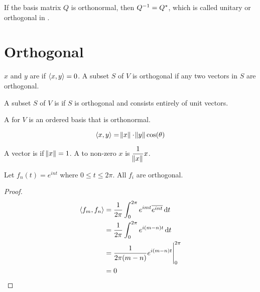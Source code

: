 If the basis matrix $Q$ is orthonormal, then ${Q}^{-1} = Q^*$, which is called unitary or orthogonal in .



\section{Orthogonal}

\begin{definition}[orthogonal]
    $x$ and $y$ are  if $\left\langle \displaystyle x, y \right\rangle = 0$. A subset $S$ of $V$ is orthogonal if any two vectors in $S$ are orthogonal. 
    
    A subset $S$ of $V$ is  if $S$ is orthogonal and consists entirely of unit vectors.
    
    A  for $V$ is an ordered basis that is orthonormal.
\end{definition}


\begin{definition}
    \begin{equation}
        \left\langle \displaystyle x, y \right\rangle = \norm{x} \cdot \norm{y} \text{cos}(\theta)
    \end{equation}    
\end{definition}


\begin{definition}
	A vector is  if $\norm{x} = 1$. A  to non-zero $x$ is $\dfrac{1}{\norm{x}} x$.
\end{definition}


\begin{theorem}
    Let $f_n (t) = e^{i nt}$ where $0 \leq t \leq 2 \pi$. All $f_i$ are orthogonal.
\end{theorem}
\begin{proof}
    \begin{equation}
        \begin{aligned}
            \innerproduct{f_m}{f_n} &= \frac{1}{2 \pi} \int_0^{2 \pi} e^{imt} \overline{e^{int}} \dif{t} \\
            &= \frac{1}{2\pi} \int_0^{2\pi} e^{i (m-n) t} \dif{t} \\
            &= \eval{\frac{1}{2\pi (m-n)} e^{i(m-n)t}}_0^{2\pi} \\
            &= 0
        \end{aligned}
    \end{equation}
\end{proof}

